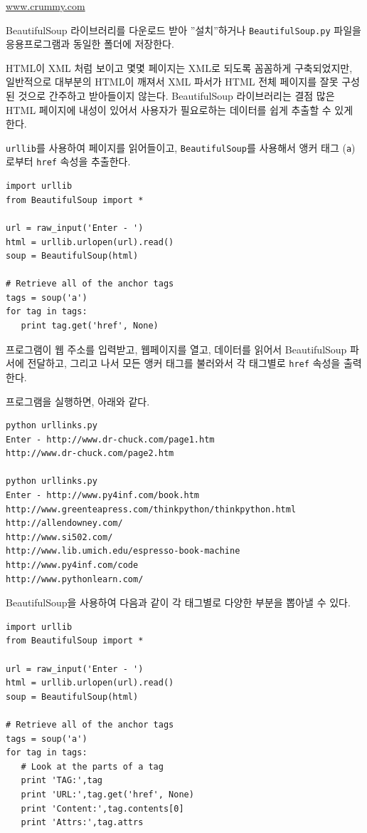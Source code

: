 \url{www.crummy.com}

BeautifulSoup 라이브러리를 다운로드 받아 ''설치''하거나 {\tt BeautifulSoup.py} 파일을 응용프로그램과 동일한 폴더에 저장한다.

HTML이 XML 처럼 보이고 몇몇 페이지는 XML로 되도록 꼼꼼하게 구축되었지만, 
일반적으로 대부분의 HTML이 깨져서 XML 파서가 HTML 전체 페이지를 잘못 구성된 것으로 간주하고 받아들이지 않는다.
BeautifulSoup 라이브러리는 결점 많은 HTML 페이지에 내성이 있어서 사용자가 필요로하는 데이터를 쉽게 추출할 수 있게 한다.

{\tt urllib}를 사용하여 페이지를 읽어들이고, {\tt BeautifulSoup}를 사용해서 앵커 태그 ({\tt a})로부터 {\tt href} 속성을  추출한다.


\beforeverb
\begin{verbatim}
import urllib
from BeautifulSoup import *

url = raw_input('Enter - ')
html = urllib.urlopen(url).read()
soup = BeautifulSoup(html)

# Retrieve all of the anchor tags
tags = soup('a')
for tag in tags:
   print tag.get('href', None)
\end{verbatim}
\afterverb
%

프로그램이 웹 주소를 입력받고, 웹페이지를 열고, 데이터를 읽어서 BeautifulSoup 파서에 전달하고,
그리고 나서 모든 앵커 태그를 불러와서 각 태그별로 {\tt href} 속성을 출력한다.

프로그램을 실행하면, 아래와 같다.

\beforeverb
\begin{verbatim}
python urllinks.py 
Enter - http://www.dr-chuck.com/page1.htm
http://www.dr-chuck.com/page2.htm

python urllinks.py 
Enter - http://www.py4inf.com/book.htm
http://www.greenteapress.com/thinkpython/thinkpython.html
http://allendowney.com/
http://www.si502.com/
http://www.lib.umich.edu/espresso-book-machine
http://www.py4inf.com/code
http://www.pythonlearn.com/
\end{verbatim}
\afterverb
%

BeautifulSoup을 사용하여 다음과 같이 각 태그별로 다양한 부분을 뽑아낼 수 있다.

\beforeverb
\begin{verbatim}
import urllib
from BeautifulSoup import *

url = raw_input('Enter - ')
html = urllib.urlopen(url).read()
soup = BeautifulSoup(html)

# Retrieve all of the anchor tags
tags = soup('a')
for tag in tags:
   # Look at the parts of a tag
   print 'TAG:',tag
   print 'URL:',tag.get('href', None)
   print 'Content:',tag.contents[0]
   print 'Attrs:',tag.attrs
\end{verbatim}
\afterverb
%

